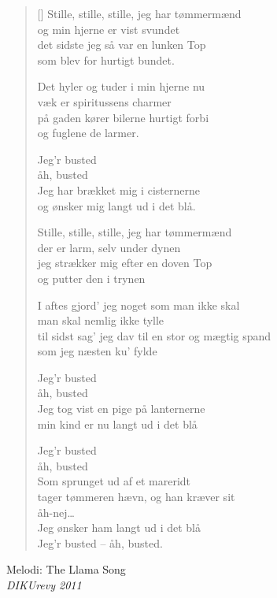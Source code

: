\begin{multicols}{2}
\settowidth{\versewidth}{til sidst sag’ jeg dav til en stor og mægtig spand}
\begin{verse}[\versewidth]
Stille, stille, stille, jeg har tømmermænd\\
og min hjerne er vist svundet\\
det sidste jeg så var en lunken Top\\
som blev for hurtigt bundet.

Det hyler og tuder i min hjerne nu\\
væk er spiritussens charmer\\
på gaden kører bilerne hurtigt forbi\\
og fuglene de larmer.

Jeg’r busted\\
åh, busted\\
Jeg har brækket mig i cisternerne\\
og ønsker mig langt ud i det blå.

Stille, stille, stille, jeg har tømmermænd\\
der er larm, selv under dynen\\
jeg strækker mig efter en doven Top\\
og putter den i trynen

I aftes gjord’ jeg noget som man ikke skal\\
man skal nemlig ikke tylle\\
til sidst sag’ jeg dav til en stor og mægtig spand\\
som jeg næsten ku’ fylde

Jeg’r busted\\
åh, busted\\
Jeg tog vist en pige på lanternerne\\
min kind er nu langt ud i det blå

Jeg’r busted\\
åh, busted\\
Som sprunget ud af et mareridt\\
tager tømmeren hævn, og han kræver sit\\
åh-nej\ldots\\
Jeg ønsker ham langt ud i det blå\\
Jeg’r busted – åh, busted.
\end{verse}
\end{multicols}


\newpage


{Melodi: The Llama Song}\\[.2em]
{\small\itshape DIKUrevy 2011}

